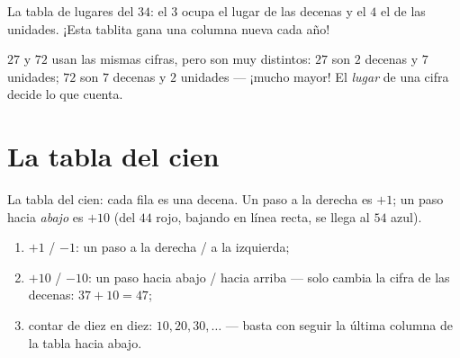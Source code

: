 \begin{omfigure}

{\small La tabla de lugares del $34$: el $3$ ocupa el lugar de las decenas y el
$4$ el de las unidades. ¡Esta tablita gana una columna nueva cada
año!}
\end{omfigure}

\begin{example}\label{ex:g1:tens:place}
$27$ y $72$ usan las mismas cifras, pero son muy distintos: $27$ son
$2$ decenas y $7$ unidades; $72$ son $7$ decenas y $2$ unidades --- ¡mucho
mayor! El \emph{lugar} de una cifra decide lo que cuenta.
\end{example}

\section{La tabla del cien}

\begin{omfigure}

{\small La tabla del cien: cada fila es una decena. Un paso a la derecha es
$+1$; un paso hacia \emph{abajo} es $+10$ (del $44$ rojo, bajando en
línea recta, se llega al $54$ azul).}
\end{omfigure}

\begin{method}\label{met:g1:tens:grid}
\begin{enumerate}
  \item $+1$ / $-1$: un paso a la derecha / a la izquierda;
  \item $+10$ / $-10$: un paso hacia abajo / hacia arriba --- solo cambia la
        cifra de las decenas: $37 + 10 = 47$;
  \item contar de diez en diez: $10, 20, 30, \dots$ --- basta con seguir la
        última columna de la tabla hacia abajo.
\end{enumerate}
\end{method}


